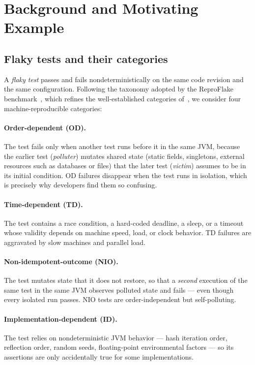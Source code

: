 \section{Background and Motivating Example}

\subsection{Flaky tests and their categories}

A \emph{flaky test} passes and fails nondeterministically on the same code
revision and the same configuration. Following the taxonomy adopted by the
ReproFlake benchmark~\cite{zhang2026reproflake}, which refines the
well-established categories of~\cite{luo2014empirical}, we consider four
machine-reproducible categories:

\paragraph{Order-dependent (OD).}
The test fails only when another test runs before it in the same JVM, because
the earlier test (\emph{polluter}) mutates shared state (static fields,
singletons, external resources such as databases or files) that the later
test (\emph{victim}) assumes to be in its initial condition. OD failures
disappear when the test runs in isolation, which is precisely why developers
find them so confusing.

\paragraph{Time-dependent (TD).}
The test contains a race condition, a hard-coded deadline, a sleep, or a
timeout whose validity depends on machine speed, load, or clock behavior.
TD failures are aggravated by slow machines and parallel load.

\paragraph{Non-idempotent-outcome (NIO).}
The test mutates state that it does not restore, so that a \emph{second}
execution of the same test in the same JVM observes polluted state and fails
— even though every isolated run passes. NIO tests are order-independent but
self-polluting.

\paragraph{Implementation-dependent (ID).}
The test relies on nondeterministic JVM behavior — hash iteration order,
reflection order, random seeds, floating-point environmental factors — so its
assertions are only accidentally true for some implementations.

